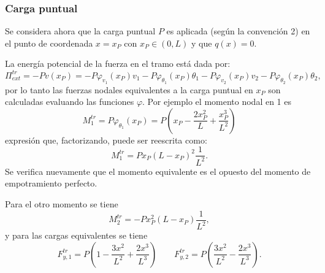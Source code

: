 \subsubsection{Carga puntual}

Se considera ahora que la carga puntual $P$ es aplicada (según la convención 2) en el punto de coordenada $x= x_P$ con $x_P \in (0,L)$ y que $q(x)=0$.

La energía potencial de la fuerza en el tramo está dada por:
%
\begin{equation}
\Pi_{ext}^{tr} = - P v (x_P) =  -P \varphi_{v_1}(x_P) v_1 - P \varphi_{\theta_1}(x_P) \theta_1
- P \varphi_{v_2}(x_P) v_2 - P \varphi_{\theta_2}(x_P) \theta_2,
\end{equation}
%
por lo tanto las fuerzas nodales equivalentes a la carga puntual en $x_P$ son calculadas evaluando las funciones $\varphi$. %
%
Por ejemplo el momento nodal en 1 es
%
\begin{equation}
M_1^{tr} = P \varphi_{\theta_1} (x_P) = P  \left(x_P - \frac{2 x_P^{2}}{L} + \frac{x_P^{3}}{L^{2}}\right)
\end{equation}
%
expresión que, factorizando, puede ser reescrita como:
\begin{equation}
M_1^{tr} = P x_P (L-x_P)^2 \frac{1}{L^2}.
\end{equation}
Se verifica nuevamente que el momento equivalente es el opuesto del momento de empotramiento perfecto.

Para el otro momento se tiene
\begin{equation}
M_2^{tr} = -P x_P^2 (L-x_P) \frac{1}{L^2},
\end{equation}
%
y para las cargas equivalentes se tiene
%
\begin{equation}
F_{y,1}^{tr} = P \left(1 - \frac{3 x^{2}}{L^{2}} + \frac{2 x^{3}}{L^{3}}\right) \qquad
F_{y,2}^{tr} =
P \left(\frac{3 x^{2}}{L^{2}} - \frac{2 x^{3}}{L^{3}}\right).
\end{equation}

%
%

